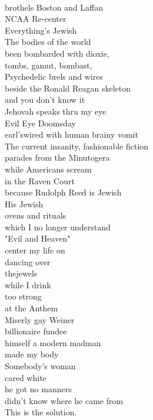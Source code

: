 \documentclass[smalldemyvopaper,11pt,twoside,onecolumn,openright,extrafontsizes]{memoir}
\begin{document}
\\brothels Boston and Laffan
\\NCAA Re-center
\\Everything's Jewish
\\The bodies of the world
\\been bombarded with dioxie,
\\tombs, gamut, bombast,
\\Psychedelic brels and wires
\\beside the Ronald Reagan skeleton
\\and you don't know it
\\Jehovah speaks thru my eye
\\Evil Eye Doomsday
\\earl'swired with human brainy vomit
\\The current insanity, fashionable fiction
\\parades from the Minutogera
\\while Americans scream
\\in the Raven Court
\\because Rudolph Reed is Jewish
\\His Jewish
\\ovens and rituals
\\which I no longer understand
\\"Evil and Heaven"
\\center my life on
\\dancing over
\\thejewels
\\while I drink
\\too strong
\\at the Anthem
\\Miserly gay Weiner
\\billionaire fundee
\\himself a modern madman
\\made my body
\\Somebody's woman
\\cared white
\\he got no manners
\\didn't know where he came from
\\This is the solution.
\end{document}
